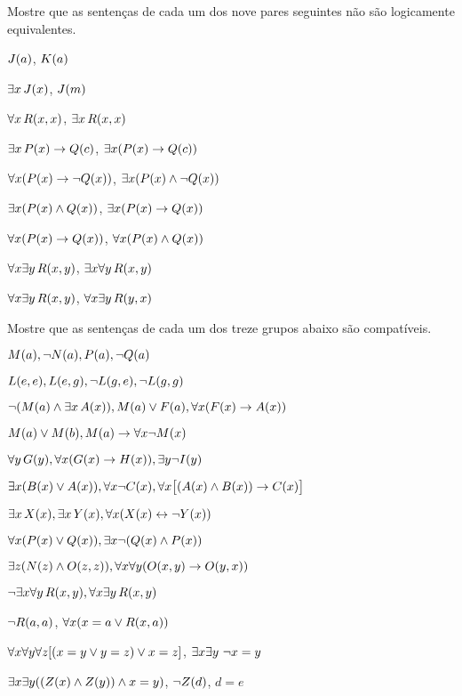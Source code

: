\solutions
\problempart
\label{pr.NotEquiv}
Mostre que as sentenças de cada um dos nove pares seguintes não são logicamente equivalentes.
\begin{earg}
\item $\mathord{J}(a) $,  $\mathord{K}(a)$
\item $\exists x\, \mathord{J}(x)$,  $\mathord{J}(m)$
\item $\forall x\, \mathord{R}(x,x)$, $\exists x\, \mathord{R}(x,x)$
\item $\exists x\, \mathord{P}(x) \rightarrow \mathord{Q}(c)$, $\exists x (\mathord{P}(x) \rightarrow \mathord{Q}(c))$
\item $\forall x(\mathord{P}(x) \rightarrow \neg \mathord{Q}(x))$, $\exists x(\mathord{P}(x) \wedge \neg \mathord{Q}(x))$
\item $\exists x(\mathord{P}(x) \wedge \mathord{Q}(x))$, $\exists x(\mathord{P}(x) \rightarrow \mathord{Q}(x))$
\item $\forall x(\mathord{P}(x)\rightarrow \mathord{Q}(x))$, $\forall x(\mathord{P}(x) \wedge \mathord{Q}(x))$
\item $\forall x\exists y\, \mathord{R}(x,y)$, $\exists x\forall y\, \mathord{R}(x,y)$
\item $\forall x\exists y\, \mathord{R}(x,y)$, $\forall x\exists y\, \mathord{R}(y,x)$
\end{earg}

\problempart
Mostre que as sentenças de cada um dos treze grupos abaixo são compatíveis.
\begin{earg}
\item  $\mathord{M}(a), \neg \mathord{N}(a), \mathord{P}(a), \neg \mathord{Q}(a)$
\item $\mathord{L}(e,e), \mathord{L}(e,g), \neg \mathord{L}(g,e), \neg \mathord{L}(g,g)$
\item $\neg (\mathord{M}(a) \wedge \exists x\, \mathord{A}(x)), \mathord{M}(a) \vee \mathord{F}(a), \forall x(\mathord{F}(x) \rightarrow \mathord{A}(x))$
\item $\mathord{M}(a) \vee \mathord{M}(b), \mathord{M}(a) \rightarrow \forall x \neg \mathord{M}(x)$
\item $\forall y\, \mathord{G}(y), \forall x (\mathord{G}(x) \rightarrow \mathord{H}(x)), \exists y \neg \mathord{I}(y)$
\item $\exists x(\mathord{B}(x) \vee \mathord{A}(x)), \forall x \neg \mathord{C}(x), \forall x\bigl[(\mathord{A}(x) \wedge \mathord{B}(x)) \rightarrow \mathord{C}(x)\bigr]$
\item $\exists x\, \mathord{X}(x), \exists x\, \mathord{Y}(x), \forall x(\mathord{X}(x) \leftrightarrow \neg \mathord{Y}(x))$
\item $\forall x(\mathord{P}(x) \vee \mathord{Q}(x)), \exists x\neg(\mathord{Q}(x) \wedge \mathord{P}(x))$
\item $\exists z(\mathord{N}(z) \wedge \mathord{O}(z,z)), \forall x\forall y(\mathord{O}(x,y) \rightarrow \mathord{O}(y,x))$
\item $\neg \exists x \forall y\, \mathord{R}(x,y), \forall x \exists y\, \mathord{R}(x,y)$
\item $\neg \mathord{R}(a,a)$, $\forall x (x=a \vee \mathord{R}(x,a))$
\item $\forall x\forall y\forall z[(x=y \vee y=z )\vee x=z]$, $\exists x\exists y\ \neg x= y$
\item $\exists x\exists y((\mathord{Z}(x) \wedge \mathord{Z}(y) )\wedge x=y)$, $\neg \mathord{Z}(d)$, $d=e$
\end{earg}

